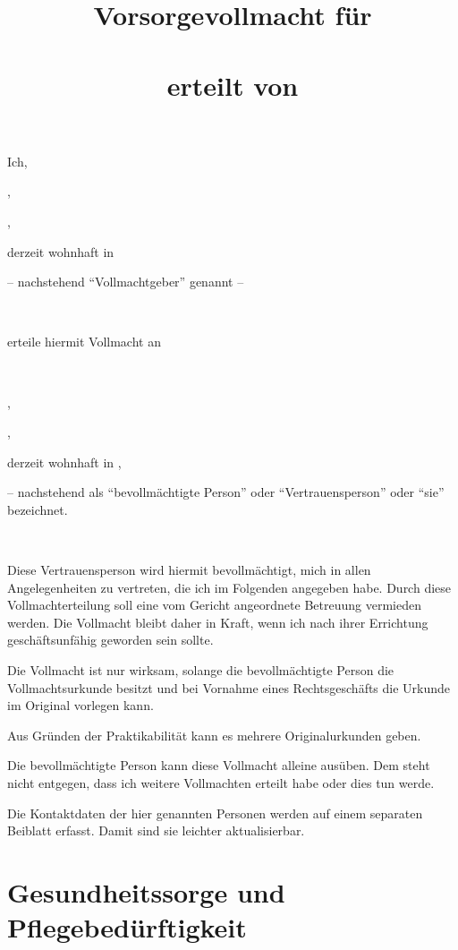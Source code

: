 \documentclass[pdftex,12pt,a4paper]{article}
\author{\myfullname}
\title{Vorsorgevollmacht für \\
       \mytrustedone\\
       erteilt von \myfullname
       }
\date{\dateissued}
\begin{document}



% 



\maketitle
\tableofcontents
\setcounter{page}{1}

\newpage




Ich,

\myfullname,

\mydataofbirth,

derzeit wohnhaft in \myaddress

-- nachstehend \enquote{Vollmachtgeber} genannt -- 

~


erteile hiermit Vollmacht an

~
 
\mytrustedone,

\mytrustedonedataofbirth,

derzeit wohnhaft in \mytrustedoneaddress,

-- nachstehend als \enquote{bevollmächtigte Person} oder 
\enquote{Vertrauensperson} oder \enquote{sie} bezeichnet.

~

Diese Vertrauensperson wird hiermit bevollmächtigt, mich in allen Angelegenheiten zu vertreten, die ich
im Folgenden angegeben habe. Durch diese Vollmachterteilung soll eine vom Gericht
angeordnete Betreuung vermieden werden. Die Vollmacht bleibt daher in Kraft, wenn ich nach ihrer
Errichtung geschäftsunfähig geworden sein sollte.

Die Vollmacht ist nur wirksam, solange die bevollmächtigte Person die Vollmachtsurkunde besitzt und
bei Vornahme eines Rechtsgeschäfts die Urkunde im Original vorlegen kann.

Aus Gründen der Praktikabilität kann es mehrere Originalurkunden geben.

Die bevollmächtigte Person kann diese Vollmacht alleine ausüben. Dem steht nicht entgegen, dass ich
weitere Vollmachten erteilt habe oder dies tun werde. 

Die Kontaktdaten der hier genannten Personen werden auf einem separaten Beiblatt erfasst. Damit sind sie leichter aktualisierbar.


\section{Gesundheitssorge und Pflegebedürftigkeit}
\end{document}
